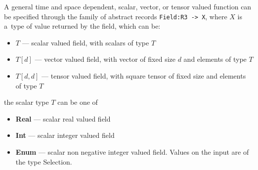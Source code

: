 A general time and space dependent, scalar, vector, or  tensor valued function can be specified through the family of abstract records 
\verb'Field:R3 -> X', where $X$ is a~type of value returned by the field, which can be:
\begin{itemize}
 \item $T$ --- scalar valued field, with scalars of type $T$
 \item $T[d]$ --- vector valued field, with vector of fixed size $d$ and elements of type $T$
 \item $T[d, d]$ --- tensor valued field, with square tensor of fixed size and elements of type $T$
\end{itemize}
the scalar type $T$ can be one of
\begin{itemize}
 \item {\bf Real} --- scalar real valued field
 \item {\bf Int}  --- scalar integer valued field
 \item {\bf Enum} --- scalar non negative integer valued field. Values on the input are of the type Selection.
\end{itemize}

